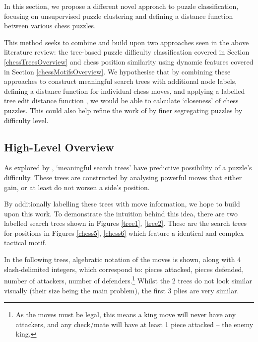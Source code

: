 In this section, we propose a different novel approach to puzzle
classification, focusing on unsupervised puzzle clustering and defining a
distance function between various chess puzzles.

This method seeks to combine and build upon two approaches seen in the above
literature review: the tree-based puzzle difficulty classification
\citep{chessTrees} covered in Section \ref{chessTreesOverview} and chess
position similarity using dynamic features \citep{chessMotifs} covered in
Section \ref{chessMotifsOverview}. We hypothesise that by combining these
approaches to construct meaningful search trees with additional node labels,
defining a distance function for individual chess moves, and applying a
labelled tree edit distance function \citep{editDistTrees}, we would be able to
calculate `closeness' of chess puzzles. This could also help refine the work of
\citet{chessTrees} by finer segregating puzzles by difficulty level.

\subsection{High-Level Overview}

As explored by \citet{chessTrees}, `meaningful search trees' have predictive
possibility of a puzzle's difficulty. These trees are constructed by analysing
powerful moves that either gain, or at least do not worsen a side's position. 

By additionally labelling these trees with move information, we hope to build
upon this work. To demonstrate the intuition behind this idea, there are two
labelled search trees shown in Figures \ref{tree1}, \ref{tree2}. These are the
search trees for positions in Figures \ref{chess5}, \ref{chess6} which feature
a identical and complex tactical motif. 

In the following trees, algebratic notation of the moves is shown, along with 4
slash-delimited integers, which correspond to: pieces attacked, pieces
defended, number of attackers, number of defenders.\footnote{As the moves must
be legal, this means a king move will never have any attackers, and any
check/mate will have at least 1 piece attacked -- the enemy king.} Whilst the 2
trees do not look similar visually (their size being the main problem), the
first 3 plies are very similar. 

